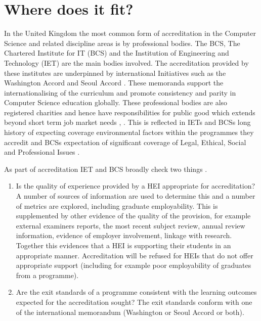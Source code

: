 \documentclass[sigconf]{acmart}
\begin{document}
\section {Where does it fit?	}

In the United Kingdom the most common form of accreditation in the Computer Science and related discipline areas is by professional bodies.  The BCS, The Chartered Institute for IT (BCS) and the Institution of Engineering and Technology (IET) are the main bodies involved. The accreditation provided by these institutes are underpinned by international Initiatives such as the Washington Accord \cite{Washington2019} and Seoul Accord \cite{Seoul2019}. These memoranda support the internationalising of the curriculum and promote consistency and parity in Computer Science education globally. These professional bodies are also registered charities and hence have responsibilities for public good which extends beyond short term job market needs \cite{Stensaker2006}, \cite{Mutereko2017}. This is reflected in IETs and BCSs long history of expecting coverage environmental factors within the programmes they accredit and BCSs expectation of significant coverage of Legal, Ethical, Social and Professional Issues \cite{Brooke2018}. 

As part of accreditation IET and BCS broadly check two things \cite{BCS2018a, IET2019}. 

\begin{enumerate}
    \item Is the quality of experience provided by a HEI appropriate for accreditation?
    A number of sources of information are used to determine this and a number of metrics are explored, including graduate employability.  This is supplemented by other evidence of the quality of the provision, for example external examiners reports, the most recent subject review, annual review information, evidence of employer involvement, linkage with research. Together this evidences that a HEI is supporting their students in an appropriate manner. Accreditation will be refused for HEIs that do not offer appropriate support (including for example poor employability of graduates from a programme).  
    \item Are the exit standards of a programme consistent with the learning outcomes expected for the accreditation sought? The exit standards conform with one of the international memorandum (Washington or Seoul Accord or both). 
\end{enumerate}
\end{document}

